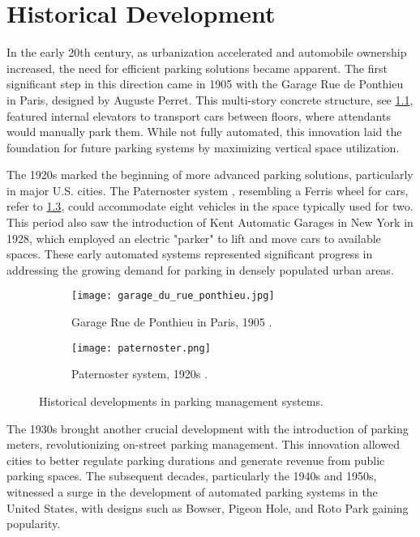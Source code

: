 \chapter{Historical Development}\label{ch:historical_development}

In the early 20th century, as urbanization accelerated and automobile ownership increased, the need for efficient parking solutions became apparent. The first significant step in this direction came in 1905 with the Garage Rue de Ponthieu \autocite{mcdonald2005parking} in Paris, designed by Auguste Perret. This multi-story concrete structure, see \cref{fig:garage_rue_de_ponthieu}, featured internal elevators to transport cars between floors, where attendants would manually park them. While not fully automated, this innovation laid the foundation for future parking systems by maximizing vertical space utilization.

The 1920s marked the beginning of more advanced parking solutions, particularly in major U.S. cities. The Paternoster system \autocite{paternoster2022}, resembling a Ferris wheel for cars, refer to \cref{fig:pater_noster_parking_system}, could accommodate eight vehicles in the space typically used for two. This period also saw the introduction of Kent Automatic Garages in New York in 1928, which employed an electric "parker" to lift and move cars to available spaces. These early automated systems represented significant progress in addressing the growing demand for parking in densely populated urban areas.

\begin{figure}
	\hfill
	\begin{subfigure}{0.45\textwidth}
		\texttt{[image: garage\_du\_rue\_ponthieu.jpg]}
		\caption{Garage Rue de Ponthieu in Paris, 1905 \autocite{mcdonald2005parking}.}\label{fig:garage_rue_de_ponthieu}
	\end{subfigure}
	\hfill
	\begin{subfigure}{0.45\textwidth}
		\texttt{[image: paternoster.png]}
		\caption{Paternoster system, 1920s \autocite{paternoster2022}.}\label{fig:pater_noster_parking_system}
	\end{subfigure}
	\hfill

	\caption{Historical developments in parking management systems.}
\end{figure}

The 1930s brought another crucial development with the introduction of parking meters, revolutionizing on-street parking management. This innovation allowed cities to better regulate parking durations and generate revenue from public parking spaces. The subsequent decades, particularly the 1940s and 1950s, witnessed a surge in the development of automated parking systems in the United States, with designs such as Bowser, Pigeon Hole, and Roto Park \autocite{shoup2012cars} gaining popularity.

